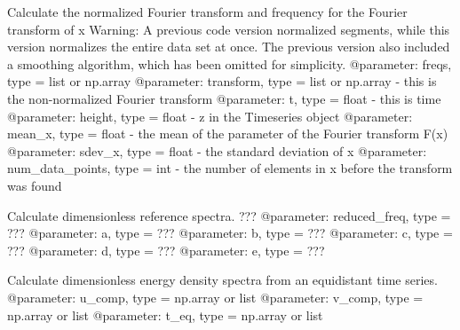 \documentclass[letterpaper,10pt,english]{sphinxmanual}
\begin{document}
\begin{fulllineitems}
\label{\detokenize{index:windtunnel.calc_normalization_params}}
Calculate the normalized Fourier transform and frequency for the 
Fourier transform of x
Warning: A previous code version normalized segments, while this version 
normalizes the entire data set at once. The previous version also included 
a smoothing algorithm, which has been omitted for simplicity.
@parameter: freqs, type = list or np.array
@parameter: transform, type = list or np.array - this is the non-normalized Fourier transform
@parameter: t, type = float - this is time
@parameter: height, type = float - z in the Timeseries object
@parameter: mean\_x, type = float - the mean of the parameter of the Fourier transform F(x)
@parameter: sdev\_x, type = float - the standard deviation of x
@parameter: num\_data\_points, type = int - the number of elements in x before the transform was found

\end{fulllineitems}


\begin{fulllineitems}
\label{\detokenize{index:windtunnel.calc_ref_spectra}}
Calculate dimensionless reference spectra. ???
@parameter: reduced\_freq, type = ???
@parameter: a, type = ???
@parameter: b, type = ???
@parameter: c, type = ???
@parameter: d, type = ???
@parameter: e, type = ???

\end{fulllineitems}


\begin{fulllineitems}
\label{\detokenize{index:windtunnel.calc_spectra}}
Calculate dimensionless energy density spectra from an equidistant 
time series.
@parameter: u\_comp, type = np.array or list
@parameter: v\_comp, type = np.array or list
@parameter: t\_eq, type = np.array or list

\end{fulllineitems}
\end{document}
